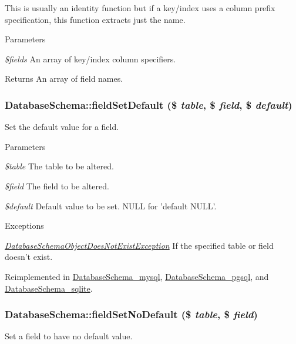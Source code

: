This is usually an identity function but if a key/index uses a column prefix specification, this function extracts just the name.


\begin{DoxyParams}{Parameters}
\item[{\em \$fields}]An array of key/index column specifiers.\end{DoxyParams}
\begin{DoxyReturn}{Returns}
An array of field names. 
\end{DoxyReturn}
\hypertarget{classDatabaseSchema_a0e7b9c13344b59584bf6e1ddea009592}{
\subsubsection[{fieldSetDefault}]{\setlength{\rightskip}{0pt plus 5cm}DatabaseSchema::fieldSetDefault (\$ {\em table}, \/  \$ {\em field}, \/  \$ {\em default})}}
\label{classDatabaseSchema_a0e7b9c13344b59584bf6e1ddea009592}
Set the default value for a field.


\begin{DoxyParams}{Parameters}
\item[{\em \$table}]The table to be altered. \item[{\em \$field}]The field to be altered. \item[{\em \$default}]Default value to be set. NULL for 'default NULL'.\end{DoxyParams}

\begin{DoxyExceptions}{Exceptions}
\item[{\em \hyperlink{classDatabaseSchemaObjectDoesNotExistException}{DatabaseSchemaObjectDoesNotExistException}}]If the specified table or field doesn't exist. \end{DoxyExceptions}


Reimplemented in \hyperlink{classDatabaseSchema__mysql_ae88383059811a3c3328455ef04aea15a}{DatabaseSchema\_\-mysql}, \hyperlink{classDatabaseSchema__pgsql_a2f17e2a4831ccba761ff37080acad92b}{DatabaseSchema\_\-pgsql}, and \hyperlink{classDatabaseSchema__sqlite_a357cd81ce4c000c77592cdcea4bc8d06}{DatabaseSchema\_\-sqlite}.\hypertarget{classDatabaseSchema_ae4de35c98eed09a4c38d82e3f17ed8a6}{
\subsubsection[{fieldSetNoDefault}]{\setlength{\rightskip}{0pt plus 5cm}DatabaseSchema::fieldSetNoDefault (\$ {\em table}, \/  \$ {\em field})}}
\label{classDatabaseSchema_ae4de35c98eed09a4c38d82e3f17ed8a6}
Set a field to have no default value.


